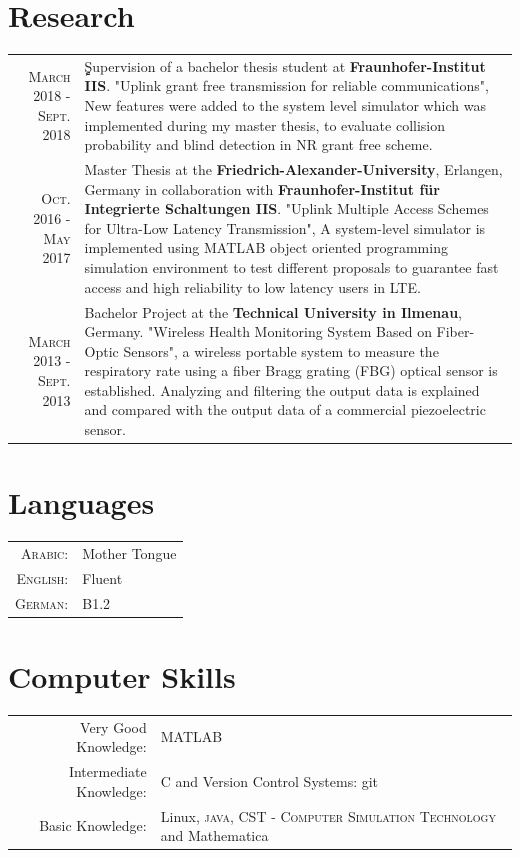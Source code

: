 \documentclass[a4paper,10pt]{article}
\begin{document}
\section{Research}
\begin{tabular}{r|p{9cm}}
\textsc{March} 2018 - \textsc{Sept.} 2018 & ٍٍSupervision of a bachelor thesis student at {\bf Fraunhofer-Institut IIS}. "Uplink grant free transmission for reliable communications", New features were added to the system level simulator which was implemented during my master thesis, to evaluate collision probability and blind detection in NR grant free scheme.\\
\textsc{Oct.} 2016 - \textsc{May} 2017 & Master Thesis at the {\bf Friedrich-Alexander-University}, Erlangen, Germany in collaboration with {\bf Fraunhofer-Institut für Integrierte Schaltungen IIS}. "Uplink Multiple Access Schemes for Ultra-Low Latency Transmission", A system-level simulator is implemented using MATLAB object oriented programming simulation environment to test different proposals to guarantee fast access and high reliability to low latency users in LTE.\\
 \textsc{March} 2013 - \textsc{Sept.} 2013 & Bachelor Project at the {\bf Technical University in Ilmenau}, Germany. "Wireless Health Monitoring System Based on Fiber-Optic Sensors", a wireless portable system to measure the respiratory rate using a fiber Bragg grating (FBG) optical sensor is established. Analyzing and filtering the output data is explained and compared with the output data of a commercial piezoelectric sensor.\\
\end{tabular}






\section{Languages}
\begin{tabular}{rl}
\textsc{Arabic:}&Mother Tongue\\
\textsc{English:}&Fluent\\
\textsc{German:}&B1.2\\
\end{tabular}

\section{Computer Skills}
\begin{tabular}{rl}
Very Good Knowledge:& \textsc{MATLAB} \\
Intermediate Knowledge:& C and Version Control Systems: git \\
Basic Knowledge:& Linux, \textsc{java}, \textsc{CST - Computer Simulation Technology} and Mathematica
\end{tabular}
\end{document}
